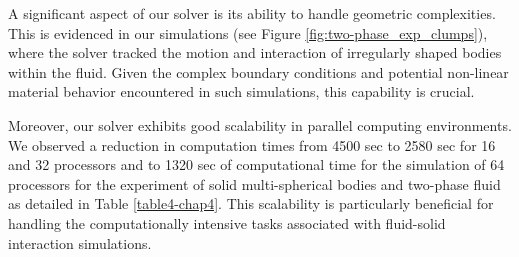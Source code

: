 A significant aspect of our solver is its ability to handle geometric complexities. This is evidenced in our simulations (see Figure \ref{fig:two-phase_exp_clumps}), where the solver tracked the motion and interaction of irregularly shaped bodies within the fluid. Given the complex boundary conditions and potential non-linear material behavior encountered in such simulations, this capability is crucial. 


Moreover, our solver exhibits good scalability in parallel computing environments. We observed a reduction in computation times from 4500 sec to 2580 sec for 16 and 32 processors and to 1320 sec of computational time for the simulation of 64 processors for the experiment of solid multi-spherical bodies and two-phase fluid as detailed in Table \ref{table4-chap4}. This scalability is particularly beneficial for handling the computationally intensive tasks associated with fluid-solid interaction simulations.

 





